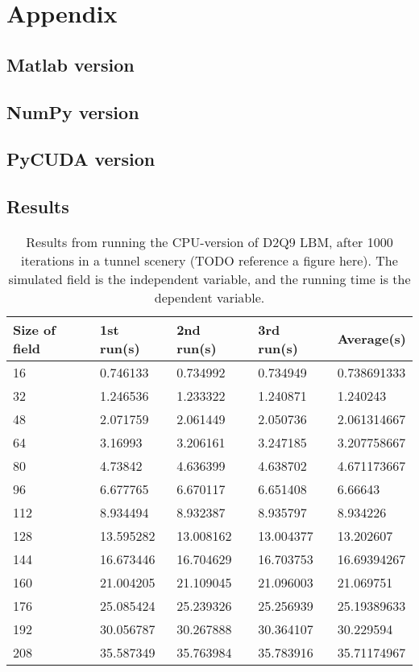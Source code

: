 \section{Appendix}

\subsection{Matlab version}


\newpage
\subsection{NumPy version}


\newpage
\subsection{PyCUDA version}



\subsection{Results}
\begin{table}[H]
\centering
\begin{tabular}{lllll}
\toprule
Size	 of field &1st run(s)&	2nd run(s)&	3rd run(s) &	Average(s)\\
\midrule
16&	0.746133&	0.734992&	0.734949&	0.738691333\\
32&	1.246536&	1.233322&	1.240871&	1.240243\\
48&	2.071759&	2.061449&	2.050736&	2.061314667\\
64&	3.16993&		3.206161&	3.247185&	3.207758667\\
80&	4.73842&		4.636399&	4.638702&	4.671173667\\
96&	6.677765&	6.670117&	6.651408&	6.66643\\
112&	8.934494&	8.932387&	8.935797&	8.934226\\
128&	13.595282&	13.008162&	13.004377&	13.202607\\
144&	16.673446&	16.704629&	16.703753&	16.69394267\\
160&	21.004205&	21.109045&	21.096003&	21.069751\\
176&	25.085424&	25.239326&	25.256939&	25.19389633\\
192&	30.056787&	30.267888&	30.364107&	30.229594\\
208&	35.587349&	35.763984&	35.783916&	35.71174967\\
\bottomrule
\end{tabular}
\caption{Results from running the CPU-version of D2Q9 LBM, after 1000 iterations in a tunnel scenery (TODO reference a figure here). The simulated field is the independent variable, and the running time is the dependent variable.}
\label{resultcpu}
\end{table}



